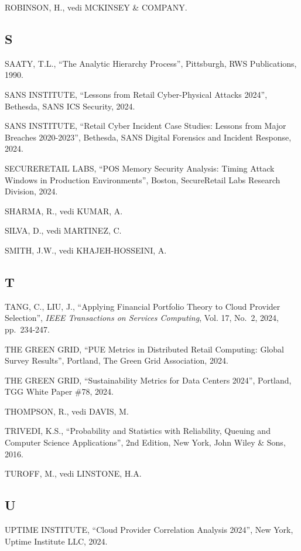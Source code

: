 \documentclass{report}
\begin{document}
ROBINSON, H., vedi MCKINSEY \& COMPANY.

\subsection{S}\label{s-1}

SAATY, T.L., ``The Analytic Hierarchy Process'', Pittsburgh, RWS
Publications, 1990.

SANS INSTITUTE, ``Lessons from Retail Cyber-Physical Attacks 2024'',
Bethesda, SANS ICS Security, 2024.

SANS INSTITUTE, ``Retail Cyber Incident Case Studies: Lessons from Major
Breaches 2020-2023'', Bethesda, SANS Digital Forensics and Incident
Response, 2024.

SECURERETAIL LABS, ``POS Memory Security Analysis: Timing Attack Windows
in Production Environments'', Boston, SecureRetail Labs Research
Division, 2024.

SHARMA, R., vedi KUMAR, A.

SILVA, D., vedi MARTINEZ, C.

SMITH, J.W., vedi KHAJEH-HOSSEINI, A.

\subsection{T}\label{t-1}

TANG, C., LIU, J., ``Applying Financial Portfolio Theory to Cloud
Provider Selection'', \emph{IEEE Transactions on Services Computing},
Vol. 17, No.~2, 2024, pp.~234-247.

THE GREEN GRID, ``PUE Metrics in Distributed Retail Computing: Global
Survey Results'', Portland, The Green Grid Association, 2024.

THE GREEN GRID, ``Sustainability Metrics for Data Centers 2024'',
Portland, TGG White Paper \#78, 2024.

THOMPSON, R., vedi DAVIS, M.

TRIVEDI, K.S., ``Probability and Statistics with Reliability, Queuing
and Computer Science Applications'', 2nd Edition, New York, John Wiley
\& Sons, 2016.

TUROFF, M., vedi LINSTONE, H.A.

\subsection{U}\label{u-1}

UPTIME INSTITUTE, ``Cloud Provider Correlation Analysis 2024'', New
York, Uptime Institute LLC, 2024.
\end{document}
